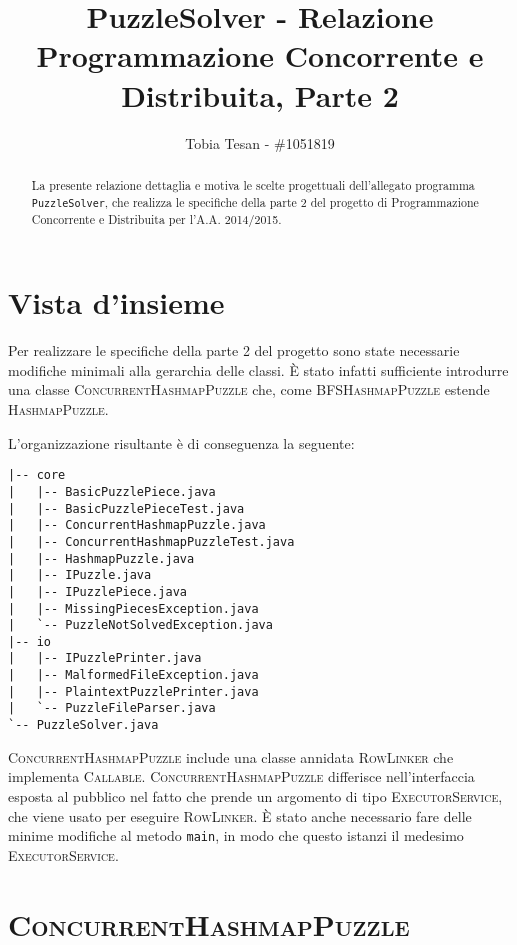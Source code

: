 \documentclass[a4paper]{article}
\title{PuzzleSolver - Relazione Programmazione Concorrente e Distribuita, Parte 2}
\author{Tobia Tesan - \#1051819}
\newcommand{\Classname}[1]{\textsc{#1}}
\newcommand{\Ifacename}[1]{\textsc{#1}}
\newcommand{\Methodname}[1]{\texttt{#1}}
\begin{document}
\maketitle

\begin{abstract}
La presente relazione dettaglia e motiva le scelte progettuali dell'allegato programma \texttt{PuzzleSolver}, che realizza le specifiche della parte 2 del progetto di Programmazione Concorrente e Distribuita per l'A.A. 2014/2015.
\end{abstract}

\tableofcontents

\section{Vista d'insieme}

Per realizzare le specifiche della parte 2 del progetto sono state necessarie modifiche minimali alla gerarchia delle classi.
\`E stato infatti sufficiente introdurre una classe \Classname{ConcurrentHashmapPuzzle} che, come \Classname{BFSHashmapPuzzle} estende \Classname{HashmapPuzzle}.

L'organizzazione risultante \`e di conseguenza la seguente:

\begin{verbatim}
|-- core
|   |-- BasicPuzzlePiece.java
|   |-- BasicPuzzlePieceTest.java
|   |-- ConcurrentHashmapPuzzle.java
|   |-- ConcurrentHashmapPuzzleTest.java
|   |-- HashmapPuzzle.java
|   |-- IPuzzle.java
|   |-- IPuzzlePiece.java
|   |-- MissingPiecesException.java
|   `-- PuzzleNotSolvedException.java
|-- io
|   |-- IPuzzlePrinter.java
|   |-- MalformedFileException.java
|   |-- PlaintextPuzzlePrinter.java
|   `-- PuzzleFileParser.java
`-- PuzzleSolver.java
\end{verbatim}

\Classname{ConcurrentHashmapPuzzle} include una classe annidata \Classname{RowLinker} che implementa \Ifacename{Callable}.
\Classname{ConcurrentHashmapPuzzle} differisce nell'interfaccia esposta al pubblico nel fatto che prende un argomento di tipo \Classname{ExecutorService}, che viene usato per eseguire \Classname{RowLinker}.
\`E stato anche necessario fare delle minime modifiche al metodo \Methodname{main}, in modo che questo istanzi il medesimo \Classname{ExecutorService}.

\section{\Classname{ConcurrentHashmapPuzzle}}
\end{document}
